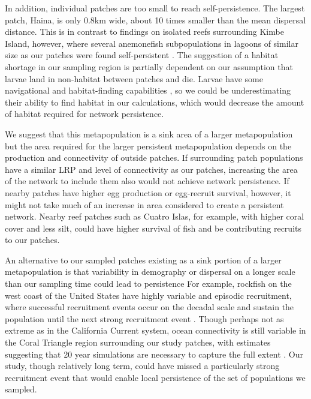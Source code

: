 \documentclass[12pt, oneside]{article}   	%
\begin{document}
In addition, individual patches are too small to reach self-persistence. The largest patch, Haina, is only 0.8km wide, about 10 times smaller than the mean dispersal distance. This is in contrast to findings on isolated reefs surrounding Kimbe Island, however, where several anemonefish subpopulations in lagoons of similar size as our patches were found self-persistent \citep{salles_coral_2015}. The suggestion of a habitat shortage in our sampling region is partially dependent on our assumption that larvae land in non-habitat between patches and die. Larvae have some navigational and habitat-finding capabilities \citep[e.g.][]{elliott1995host, fisher2005swimming}, so we could be underestimating their ability to find habitat in our calculations, which would decrease the amount of habitat required for network persistence. %

We suggest that this metapopulation is a sink area of a larger metapopulation but the area required for the larger persistent metapopulation depends on the production and connectivity of outside patches. If surrounding patch populations have a similar LRP and level of connectivity as our patches, increasing the area of the network to include them also would not achieve network persistence. If nearby patches have higher egg production or egg-recruit survival, however, it might not take much of an increase in area considered to create a persistent network. Nearby reef patches such as Cuatro Islas, for example, with higher coral cover and less silt, could have higher survival of fish and be contributing recruits to our patches. %

An alternative to our sampled patches existing as a sink portion of a larger metapopulation is that variability in demography or dispersal on a longer scale than our sampling time could lead to persistence \citep[similar to the storage effect,][]{warner1985coexistence} For example, rockfish on the west coast of the United States have highly variable and episodic recruitment, where successful recruitment events occur on the decadal scale and sustain the population until the next strong recruitment event \citep[e.g.,][]{tolimieri2005roles}. Though perhaps not as extreme as in the California Current system, ocean connectivity is still variable in the Coral Triangle region surrounding our study patches, with estimates suggesting that 20 year simulations are necessary to capture the full extent \citep{thompson2018variability}. Our study, though relatively long term, could have missed a particularly strong recruitment event that would enable local persistence of the set of populations we sampled. 
\end{document}
